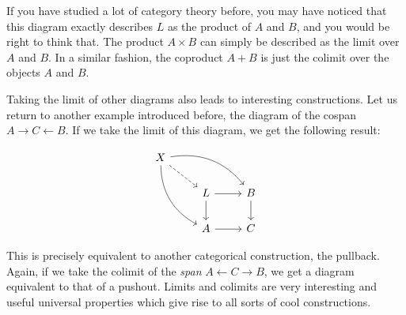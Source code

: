\documentclass{article}
\begin{document}
If you have studied a lot of category theory before, you may have noticed that
this diagram exactly describes \(L\) as the product of \(A\) and \(B\), and you
would be right to think that. The product \(A \times B\) can simply be
described as the limit over \(A\) and \(B\). In a similar fashion, the
coproduct \(A + B\) is just the colimit over the objects \(A\) and \(B\).

Taking the limit of other diagrams also leads to interesting constructions. Let
us return to another example introduced before, the diagram of the cospan \(A
\rightarrow C \leftarrow B\). If we take the limit of this diagram, we get the
following result:

\[
  \begin{tikzcd}
    X \arrow[rd, dashed] \arrow[rrd, bend left] \arrow[rdd, bend right] &                       &             \\
                                                                        & L \arrow[d] \arrow[r] & B \arrow[d] \\
                                                                        & A \arrow[r]           & C
  \end{tikzcd}
\]

This is precisely equivalent to another categorical construction, the pullback.
Again, if we take the colimit of the \textit{span} \(A \leftarrow C \rightarrow
B\), we get a diagram equivalent to that of a pushout. Limits and colimits are
very interesting and useful universal properties which give rise to all sorts
of cool constructions.
\end{document}
